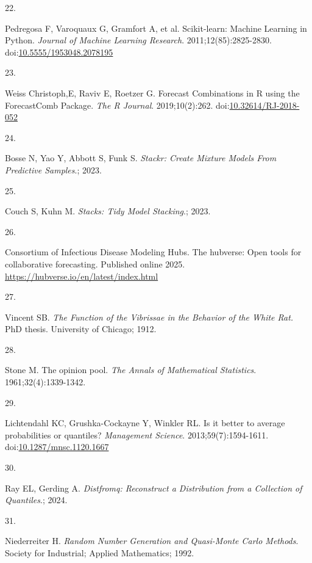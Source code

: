 \documentclass[
  letterpaper,
  DIV=11,
  numbers=noendperiod]{scrartcl}
\newlength{\cslhangindent}
\newlength{\csllabelwidth}
\newenvironment{CSLReferences}[2] %
 {\begin{list}{}{%
  \setlength{\itemindent}{0pt}
  \setlength{\leftmargin}{0pt}
  \setlength{\parsep}{0pt}
  \ifodd #1
   \setlength{\leftmargin}{\cslhangindent}
   \setlength{\itemindent}{-1\cslhangindent}
  \fi
  \setlength{\itemsep}{#2\baselineskip}}}
 {\end{list}}
\newcommand{\CSLLeftMargin}[1]{\parbox[t]{\csllabelwidth}{\strut#1\strut}}
\newcommand{\CSLRightInline}[1]{\parbox[t]{\linewidth - \csllabelwidth}{\strut#1\strut}}
\begin{document}
\begin{CSLReferences}{0}{1}
\CSLLeftMargin{22. }%
\CSLRightInline{Pedregosa F, Varoquaux G, Gramfort A, et al.
Scikit-learn: {Machine} {Learning} in {Python}. \emph{Journal of Machine
Learning Research}. 2011;12(85):2825-2830.
doi:\href{https://doi.org/10.5555/1953048.2078195}{10.5555/1953048.2078195}}

\CSLLeftMargin{23. }%
\CSLRightInline{Weiss Christoph,E, Raviv E, Roetzer G. Forecast
Combinations in R using the ForecastComb Package. \emph{The R Journal}.
2019;10(2):262.
doi:\href{https://doi.org/10.32614/RJ-2018-052}{10.32614/RJ-2018-052}}

\CSLLeftMargin{24. }%
\CSLRightInline{Bosse N, Yao Y, Abbott S, Funk S. \emph{Stackr: {Create}
{Mixture} {Models} {From} {Predictive} {Samples}}.; 2023.}

\CSLLeftMargin{25. }%
\CSLRightInline{Couch S, Kuhn M. \emph{Stacks: Tidy Model Stacking}.;
2023.}

\CSLLeftMargin{26. }%
\CSLRightInline{Consortium of Infectious Disease Modeling Hubs. The
hubverse: Open tools for collaborative forecasting. Published online
2025. \url{https://hubverse.io/en/latest/index.html}}

\CSLLeftMargin{27. }%
\CSLRightInline{Vincent SB. \emph{The Function of the Vibrissae in the
Behavior of the White Rat.} PhD thesis. University of Chicago; 1912.}

\CSLLeftMargin{28. }%
\CSLRightInline{Stone M. The opinion pool. \emph{The Annals of
Mathematical Statistics}. 1961;32(4):1339-1342.}

\CSLLeftMargin{29. }%
\CSLRightInline{Lichtendahl KC, Grushka-Cockayne Y, Winkler RL. Is it
better to average probabilities or quantiles? \emph{Management Science}.
2013;59(7):1594-1611.
doi:\href{https://doi.org/10.1287/mnsc.1120.1667}{10.1287/mnsc.1120.1667}}

\CSLLeftMargin{30. }%
\CSLRightInline{Ray EL, Gerding A. \emph{Distfromq: Reconstruct a
Distribution from a Collection of Quantiles}.; 2024.}

\CSLLeftMargin{31. }%
\CSLRightInline{Niederreiter H. \emph{Random Number Generation and
Quasi-Monte Carlo Methods}. Society for Industrial; Applied Mathematics;
1992.}


\end{CSLReferences}
\end{document}
